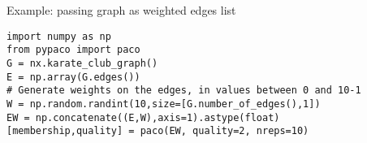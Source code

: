 \documentclass[11pt,%
              a4paper,%
]{article}
\begin{document}
Example: passing graph as weighted edges list

\begin{verbatim}    
import numpy as np
from pypaco import paco
G = nx.karate_club_graph()
E = np.array(G.edges())
# Generate weights on the edges, in values between 0 and 10-1
W = np.random.randint(10,size=[G.number_of_edges(),1])
EW = np.concatenate((E,W),axis=1).astype(float)
[membership,quality] = paco(EW, quality=2, nreps=10)
\end{verbatim}
\end{document}
